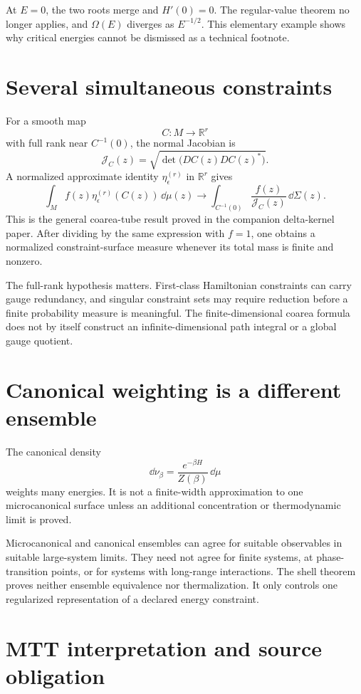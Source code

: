 \documentclass[11pt]{article}
\newcommand{\Jcal}{\mathcal J}
\begin{document}
At \(E=0\), the two roots merge and \(H'(0)=0\). The regular-value theorem no
longer applies, and \(\Omega(E)\) diverges as \(E^{-1/2}\). This elementary
example shows why critical energies cannot be dismissed as a technical
footnote.

\section{Several simultaneous constraints}

For a smooth map
\[
C:M\to\mathbb R^r
\]
with full rank near \(C^{-1}(0)\), the normal Jacobian is
\[
\Jcal_C(z)
=
\sqrt{\det\!\bigl(DC(z)DC(z)^\ast\bigr)}.
\]
A normalized approximate identity
\(\eta_\epsilon^{(r)}\) in \(\mathbb R^r\) gives
\[
\int_M f(z)\eta_\epsilon^{(r)}(C(z))\,\dd\mu(z)
\longrightarrow
\int_{C^{-1}(0)}
\frac{f(z)}{\Jcal_C(z)}\,\dd\Sigma(z).
\]
This is the general coarea-tube result proved in the companion delta-kernel
paper. After dividing by the same expression with \(f=1\), one obtains a
normalized constraint-surface measure whenever its total mass is finite and
nonzero.

The full-rank hypothesis matters. First-class Hamiltonian constraints can
carry gauge redundancy, and singular constraint sets may require reduction
before a finite probability measure is meaningful. The finite-dimensional
coarea formula does not by itself construct an infinite-dimensional path
integral or a global gauge quotient.

\section{Canonical weighting is a different ensemble}

The canonical density
\[
\dd\nu_\beta
=
\frac{e^{-\beta H}}{Z(\beta)}\,\dd\mu
\]
weights many energies. It is not a finite-width approximation to one
microcanonical surface unless an additional concentration or thermodynamic
limit is proved.

Microcanonical and canonical ensembles can agree for suitable observables in
suitable large-system limits. They need not agree for finite systems, at
phase-transition points, or for systems with long-range interactions. The
shell theorem proves neither ensemble equivalence nor thermalization. It only
controls one regularized representation of a declared energy constraint.

\section{MTT interpretation and source obligation}
\end{document}
